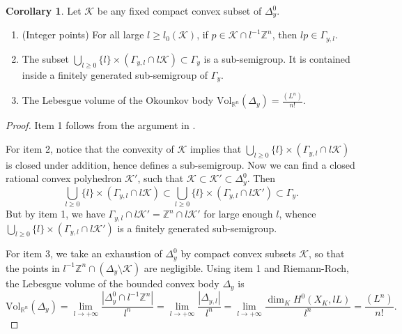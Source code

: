 \documentclass[a4paper]{article}
\theoremstyle{definition}
\newtheorem{cor}[thm]{Corollary}
\newcommand{\R}{\mathbb{R}}
\newcommand{\Z}{\mathbb{Z}}
\begin{document}
\begin{cor}\label{cor:semigroup}
Let $\mathcal{K}$ be any fixed compact  convex  subset of $\Delta_y^0$. 
\begin{enumerate}
	

	
	\item (Integer points) For all large $l\geq l_0(\mathcal{K})$, if $p\in \mathcal{K}\cap l^{-1} \Z^n$, then $lp\in \Gamma_{y,l}$.
	
	

		\item The subset $ \bigcup_{l\geq 0} \{    l        \} \times (\Gamma_{y,l}\cap l\mathcal{K}) \subset \Gamma_y$ is a sub-semigroup. It is contained inside a finitely generated sub-semigroup of $\Gamma_y$.
	
	
	\item The Lebesgue volume of the Okounkov body $\text{Vol}_{\R^n}(\Delta_y) = \frac{(L^n)}{n!}$.
\end{enumerate}



\end{cor}


\begin{proof}
Item 1 follows from the argument in  \cite[Lemma 2.3]{WittNystrom}.


For item 2, notice that the convexity of $\mathcal{K}$ implies that $\bigcup_{l\geq 0} \{    l        \} \times (\Gamma_{y,l}\cap l\mathcal{K})$ is closed under addition, hence defines a sub-semigroup. Now we can find a closed rational convex polyhedron $\mathcal{K}'$, such that $\mathcal{K}\subset \mathcal{K}'\subset \Delta_y^0$. Then
\[
 \bigcup_{l\geq 0} \{    l        \} \times (\Gamma_{y,l}\cap l\mathcal{K})  \subset  \bigcup_{l\geq 0} \{    l        \} \times (\Gamma_{y,l}\cap l\mathcal{K}') \subset \Gamma_y.
\]
But by item 1,  we have  $ \Gamma_{y,l}\cap l\mathcal{K}'= \Z^n \cap l\mathcal{K}'$   for large enough $l$, whence $ \bigcup_{l\geq 0} \{    l        \} \times (\Gamma_{y,l}\cap l\mathcal{K}')$ is a finitely generated sub-semigroup.





For item 3, we take an exhaustion of $\Delta_y^0$ by compact convex subsets $\mathcal{K}$, so that the points  in $l^{-1}\Z^n\cap (\Delta_y\setminus \mathcal{K})$ are negligible. Using item 1 and Riemann-Roch, the Lebesgue volume of the bounded convex body $\Delta_y$ is
\[
\text{Vol}_{\R^n}(\Delta_y) = \lim_{l\to +\infty} \frac{ |\Delta_y^0\cap l^{-1}\Z^n| }{ l^n  }= \lim_{l\to +\infty}  \frac{ |\Delta_{y,l}| }{ l^n  }=  \lim_{l\to +\infty} \frac{ \dim_K H^0(X_K, lL)}{l^n}= \frac{(L^n)}{n!}.
\]

\end{proof}
\end{document}

